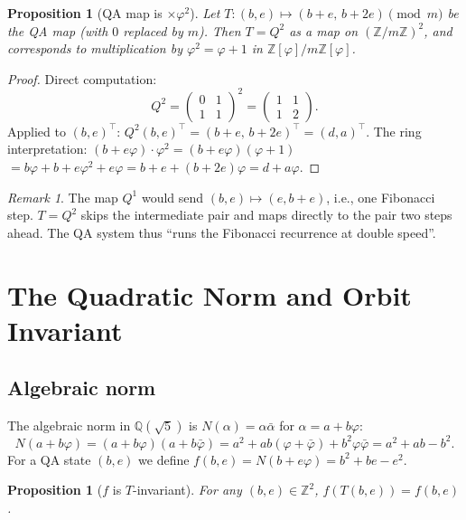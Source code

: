 \documentclass[11pt]{article}
\newtheorem{proposition}[theorem]{Proposition}
\theoremstyle{definition}
\theoremstyle{remark}
\newtheorem{remark}[theorem]{Remark}
\newcommand{\Zfi}{\mathbb{Z}[\varphi]}
\newcommand{\Qfi}{\mathbb{Q}(\sqrt{5})}
\newcommand{\Nm}[1]{N\!\left(#1\right)}
\begin{document}
\begin{proposition}[QA map is $\times\varphi^2$]
\label{prop:qa-is-phi2}
Let $T:(b,e)\mapsto(b{+}e,\,b{+}2e)\pmod{m}$ be the QA map (with $0$ replaced
by $m$).  Then $T=Q^2$ as a map on $(\mathbb{Z}/m\mathbb{Z})^2$, and corresponds
to multiplication by $\varphi^2=\varphi+1$ in $\Zfi/m\Zfi$.
\end{proposition}

\begin{proof}
Direct computation:
\[
  Q^2 = \begin{pmatrix}0&1\\1&1\end{pmatrix}^2
      = \begin{pmatrix}1&1\\1&2\end{pmatrix}.
\]
Applied to $(b,e)^\top$: $Q^2(b,e)^\top=(b+e,\,b+2e)^\top=(d,a)^\top$.
The ring interpretation: $(b+e\varphi)\cdot\varphi^2=(b+e\varphi)(\varphi+1)$
$=b\varphi+b+e\varphi^2+e\varphi=b+e+(b+2e)\varphi=d+a\varphi$.
\end{proof}

\begin{remark}
The map $Q^1$ would send $(b,e)\mapsto(e,b+e)$, i.e., one Fibonacci step.
$T=Q^2$ skips the intermediate pair and maps directly to the pair two steps ahead.
The QA system thus ``runs the Fibonacci recurrence at double speed''.
\end{remark}

\section{The Quadratic Norm and Orbit Invariant}
\label{sec:norm}

\subsection{Algebraic norm}

The algebraic norm in $\Qfi$ is $N(\alpha)=\alpha\bar\alpha$ for
$\alpha=a+b\varphi$:
\[
  \Nm{a+b\varphi}
  = (a+b\varphi)(a+b\bar\varphi)
  = a^2+ab(\varphi+\bar\varphi)+b^2\varphi\bar\varphi
  = a^2+ab-b^2.
\]
For a QA state $(b,e)$ we define $f(b,e)=\Nm{b+e\varphi}=b^2+be-e^2$.

\begin{proposition}[$f$ is $T$-invariant]
\label{prop:norm-invariant}
For any $(b,e)\in\mathbb{Z}^2$, $f(T(b,e))=f(b,e)$.
\end{proposition}
\end{document}
